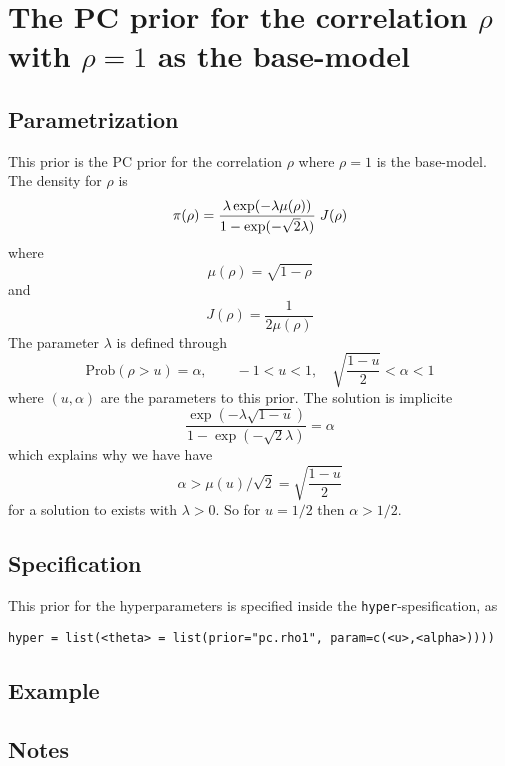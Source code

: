 \documentclass[a4paper,11pt]{article}
\begin{document}
\section*{The PC prior for the correlation $\rho$ with $\rho=1$ as the
    base-model}

\subsection*{Parametrization}
This prior is the PC prior for the correlation $\rho$ where $\rho=1$
is the base-model. The density for $\rho$ is
\begin{displaymath}
    \pi(\rho) = \frac{\lambda \exp(-\lambda \mu(\rho))}{%
        1-\exp(-\sqrt{2}\lambda)} \; J(\rho)
\end{displaymath}
where
\begin{displaymath}
    \mu(\rho) = \sqrt{1-\rho}
\end{displaymath}
and
\begin{displaymath}
    J(\rho) = \frac{1}{2\mu(\rho)}
\end{displaymath}
The parameter $\lambda$ is defined through
\begin{displaymath}
    \text{Prob}( \rho > u) = \alpha, \qquad -1 < u < 1, \quad
    \sqrt{\frac{1-u}{2}} <\alpha<1
\end{displaymath}
where $(u, \alpha{})$ are the parameters to this prior. The solution
is implicite
\begin{displaymath}
    \frac{\exp(-\lambda \sqrt{1-u})}{1-\exp(-\sqrt{2}\lambda)} = \alpha
\end{displaymath}
which explains why we have have
\begin{displaymath}
    \alpha > \mu(u)/\sqrt{2} = \sqrt{\frac{1-u}{2}}
\end{displaymath}
for a solution to exists with $\lambda > 0$. 
So for $u=1/2$ then $\alpha > 1/2$.

\subsection*{Specification}
This prior for the hyperparameters is specified inside the
\texttt{hyper}-spesification, as
\begin{center}
    \texttt{hyper = list(<theta> = list(prior="pc.rho1", param=c(<u>,<alpha>))))}
\end{center}

\subsection*{Example}

\subsection*{Notes}
\end{document}
